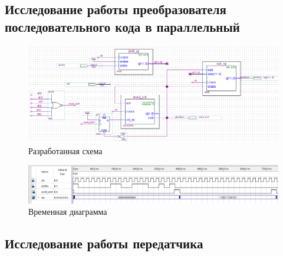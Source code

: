 \documentclass[a4paper,12pt]{article}
\begin{document}
    \subsection{Исследование работы преобразователя последовательного кода в параллельный}
    
    \begin{figure}[H]
        \centering
        \includegraphics[width=\linewidth]{scheme5}
        \caption{Разработанная схема}
    \end{figure}
    \begin{figure}[H]
        \centering
        \includegraphics[width=\linewidth]{wave5}
        \caption{Временная диаграмма}
    \end{figure}
    
    \subsection{Исследование работы передатчика}
    
\end{document}
